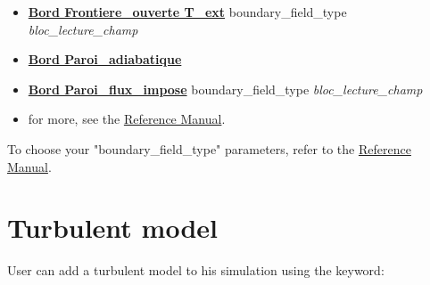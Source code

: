 {{\begin{itemize}
\item \href{\REFERENCEMANUAL\#frontiereouverte}{\textbf{Bord Frontiere\_ouverte T\_ext}}                       boundary\_field\_type \textit{bloc\_lecture\_champ}
\item \href{\REFERENCEMANUAL\#paroiadiabatique}{\textbf{Bord Paroi\_adiabatique}}
\item \href{\REFERENCEMANUAL\#paroifluximpose}{\textbf{Bord Paroi\_flux\_impose}}                             boundary\_field\_type \textit{bloc\_lecture\_champ}
\item for more, see the \href{\REFERENCEMANUAL\#condlimbase}{\trustref Reference Manual}.
\end{itemize}
}}

To choose your "boundary\_field\_type" parameters, refer to the \href{\REFERENCEMANUAL\#frontfieldbase}{\trustref Reference Manual}.


\section{Turbulent model}
User can add a turbulent model to his simulation using the keyword:
\begin{center}
\end{center}


